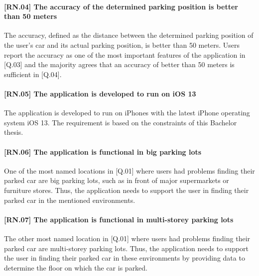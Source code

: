 \paragraph{[RN.04] The accuracy of the determined parking position is better than 50 meters}
The accuracy, defined as the distance between the determined parking position of the user's car and its actual parking position, is better than 50 meters. Users report the accuracy as one of the most important features of the application in [Q.03] and the majority agrees that an accuracy of better than 50 meters is sufficient in [Q.04]. 

\paragraph{[RN.05] The application is developed to run on iOS 13}
The application is developed to run on iPhones with the latest iPhone operating system iOS 13. The requirement is based on the constraints of this Bachelor thesis. 

\paragraph{[RN.06] The application is functional in big parking lots}
One of the most named locations in [Q.01] where users had problems finding their parked car are big parking lots, such as in front of major supermarkets or furniture stores. Thus, the application needs to support the user in finding their parked car in the mentioned environments.

\paragraph{[RN.07] The application is functional in multi-storey parking lots}
The other most named location in [Q.01] where users had problems finding their parked car are multi-storey parking lots. Thus, the application needs to support the user in finding their parked car in these environments by providing data to determine the floor on which the car is parked. 